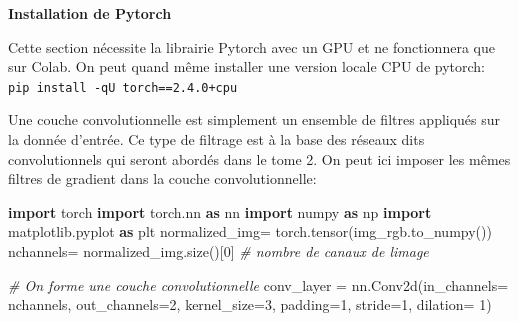 \documentclass[
]{article}
\newenvironment{Shaded}{}{}
\newcommand{\CommentTok}[1]{\textcolor[rgb]{0.38,0.63,0.69}{\textit{#1}}}
\newcommand{\DecValTok}[1]{\textcolor[rgb]{0.25,0.63,0.44}{#1}}
\newcommand{\ImportTok}[1]{\textcolor[rgb]{0.00,0.50,0.00}{\textbf{#1}}}
\newcommand{\NormalTok}[1]{#1}
\newcommand{\OperatorTok}[1]{\textcolor[rgb]{0.40,0.40,0.40}{#1}}
\begin{document}
\textbf{Installation de Pytorch}

Cette section nécessite la librairie Pytorch avec un GPU et ne
fonctionnera que sur Colab. On peut quand même installer une version
locale CPU de pytorch: \texttt{pip\ install\ -qU\ torch==2.4.0+cpu}

Une couche convolutionnelle est simplement un ensemble de filtres
appliqués sur la donnée d'entrée. Ce type de filtrage est à la base des
réseaux dits convolutionnels qui seront abordés dans le tome 2. On peut
ici imposer les mêmes filtres de gradient dans la couche
convolutionnelle:

\label{e6ce1400}
\label{cb19}
\begin{Shaded}
\begin{Highlighting}[]
\ImportTok{import}\NormalTok{ torch}
\ImportTok{import}\NormalTok{ torch.nn }\ImportTok{as}\NormalTok{ nn}
\ImportTok{import}\NormalTok{ numpy }\ImportTok{as}\NormalTok{ np}
\ImportTok{import}\NormalTok{ matplotlib.pyplot }\ImportTok{as}\NormalTok{ plt}
\NormalTok{normalized\_img}\OperatorTok{=}\NormalTok{ torch.tensor(img\_rgb.to\_numpy())}
\NormalTok{nchannels}\OperatorTok{=}\NormalTok{ normalized\_img.size()[}\DecValTok{0}\NormalTok{] }\CommentTok{\# nombre de canaux de l\textquotesingle{}image}

\CommentTok{\# On forme une couche convolutionnelle}
\NormalTok{conv\_layer }\OperatorTok{=}\NormalTok{ nn.Conv2d(in\_channels}\OperatorTok{=}\NormalTok{ nchannels, out\_channels}\OperatorTok{=}\DecValTok{2}\NormalTok{, kernel\_size}\OperatorTok{=}\DecValTok{3}\NormalTok{, padding}\OperatorTok{=}\DecValTok{1}\NormalTok{, stride}\OperatorTok{=}\DecValTok{1}\NormalTok{, dilation}\OperatorTok{=} \DecValTok{1}\NormalTok{)}


\end{Highlighting}
\end{Shaded}
\end{document}
